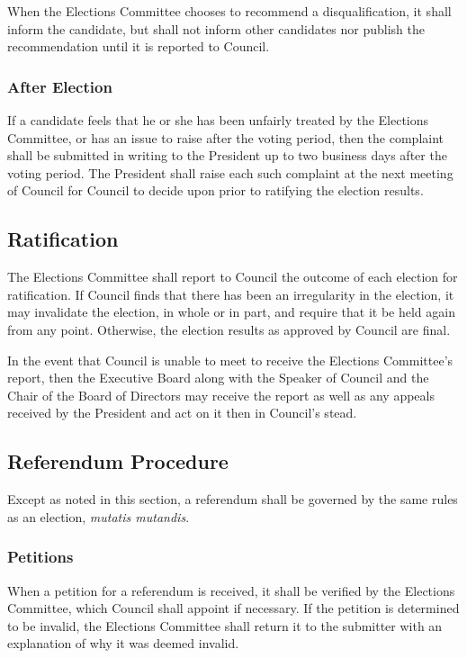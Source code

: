 When the Elections Committee chooses to recommend a disqualification, it shall inform the candidate, but shall not inform other candidates nor publish the recommendation until it is reported to Council.

\subsubsection{After Election}
If a candidate feels that he or she has been unfairly treated by the Elections Committee, or has an issue to raise after the voting period, then the complaint shall be submitted in writing to the President up to two business days after the voting period.
The President shall raise each such complaint at the next meeting of Council for Council to decide upon prior to ratifying the election results.

\subsection{Ratification}
The Elections Committee shall report to Council the outcome of each election for ratification.
If Council finds that there has been an irregularity in the election, it may invalidate the election, in whole or in part, and require that it be held again from any point.
Otherwise, the election results as approved by Council are final.

In the event that Council is unable to meet to receive the Elections Committee's report, then the Executive Board along with the Speaker of Council and the Chair of the Board of Directors  may receive the report as well as any appeals received by the President and act on it then in Council's stead.

\subsection{Referendum Procedure}
Except as noted in this section, a referendum shall be governed by the same rules as an election, \emph{mutatis mutandis}.

\subsubsection{Petitions}
When a petition for a referendum is received, it shall be verified by the Elections Committee, which Council shall appoint if necessary.
If the petition is determined to be invalid, the Elections Committee shall return it to the submitter with an explanation of why it was deemed invalid.

